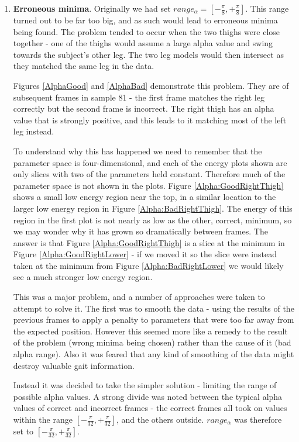 \begin{enumerate}
	\item \textbf{Erroneous minima}.
		Originally we had set $range_\alpha = \left[ -\frac{\pi}{8}, +\frac{\pi}{8}\right]$.
		This range turned out to be far too big, and as such would lead to erroneous minima being found.
		The problem tended to occur when the two thighs were close together - one of the thighs would assume
		a large alpha value and swing towards the subject's other leg.
		The two leg models would then intersect as they matched the same leg in the data.
		
		Figures \ref{AlphaGood} and \ref{AlphaBad} demonstrate this problem.
		They are of subsequent frames in sample 81 - the first frame matches the right leg correctly
		but the second frame is incorrect.
		The right thigh has an alpha value that is strongly positive, and this leads to it matching most of the left leg instead.
		
		To understand why this has happened we need to remember that the parameter space is four-dimensional, and each of the energy plots
		shown are only slices with two of the parameters held constant.
		Therefore much of the parameter space is not shown in the plots.
		Figure \ref{Alpha:GoodRightThigh} shows a small low energy region near the top, in a similar location to the larger low energy region in Figure \ref{Alpha:BadRightThigh}.
		The energy of this region in the first plot is not nearly as low as the other, correct, minimum, so we may wonder why it has grown so dramatically between frames.
		The answer is that Figure \ref{Alpha:GoodRightThigh} is a slice at the minimum in Figure \ref{Alpha:GoodRightLower} - if we moved it so the slice
		were instead taken at the minimum from Figure \ref{Alpha:BadRightLower} we would likely see a much stronger low energy region.
		
		This was a major problem, and a number of approaches were taken to attempt to solve it.
		The first was to smooth the data - using the results of the previous frames to apply a penalty to parameters that were too far away from the expected position.
		However this seemed more like a remedy to the result of the problem (wrong minima being chosen) rather than the cause of it (bad alpha range).
		Also it was feared that any kind of smoothing of the data might destroy valuable gait information.
		
		Instead it was decided to take the simpler solution - limiting the range of possible alpha values.
		A strong divide was noted between the typical alpha values of correct and incorrect frames - the correct frames all took on
		values within the range $\left[ -\frac{\pi}{32}, +\frac{\pi}{32}\right]$, and the others outside.
		$range_\alpha$ was therefore set to $\left[ -\frac{\pi}{32}, +\frac{\pi}{32}\right]$.
	

\end{enumerate}
